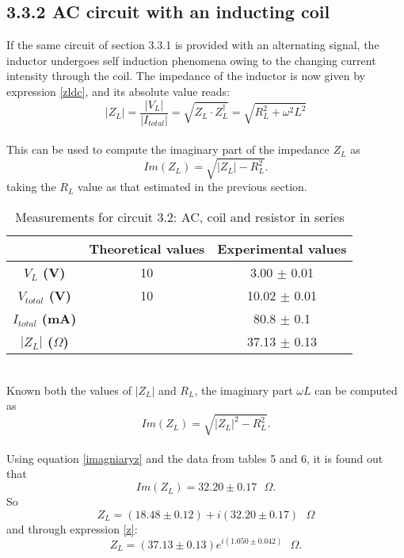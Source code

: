 \documentclass[a4paper, 12pt]{article}
\begin{document}
\subsection{3.3.2 AC circuit with an inducting coil}
If the same circuit of section 3.3.1 is provided with an alternating signal, the inductor undergoes self induction phenomena owing to the changing current intensity through the coil. The impedance of the inductor is now given by expression \ref{zldc}, and its absolute value reads:
\begin{equation}\label{abszl}
	|Z_L| = \frac{|V_L|}{|I_{total}|} = \sqrt{Z_L \cdot Z_L^\dagger} = \sqrt{R_L^2 + \omega^2L^2}
\end{equation}\\

This can be used to compute the imaginary part of the impedance $Z_L$ as
\begin{equation}\label{imzl}
	Im(Z_L) = \sqrt{|Z_L| - R_L^2}.
\end{equation}
taking the $R_L$ value as that estimated in the previous section.
\begin{table}[hbt!]
	\centering
	\begin{tabular}{|c|c|c|}
		\hline
		& \textbf{Theoretical values} & \textbf{Experimental values} \\
		\hline
		\textbf{$V_{L}$ (V)} & 10 & 3.00 $\pm$ 0.01 \\
		\textbf{$V_{total}$ (V)} & 10 & 10.02 $\pm$ 0.01\\
		\hline
		\textbf{$I_{total}$ (mA)} & & 80.8 $\pm$ 0.1 \\
		\hline
		\textbf{$|Z_{L}|$ ($\Omega$)} &  & 37.13 $\pm$ 0.13 \\
		\hline
	\end{tabular}
	\caption{Measurements for circuit 3.2: AC, coil and resistor in series}
\end{table}\\

Known both the values of $|Z_L|$ and $R_L$, the imaginary part $\omega L$ can be computed as 
\begin{equation}\label{imagniaryz}
	Im(Z_L) = \sqrt{|Z_L|^2 - R_L^2}.
\end{equation}\\

Using equation \ref{imagniaryz} and the data from tables 5 and 6, it is found out that
\begin{equation*}
	Im(Z_L) = 32.20 \pm 0.17 \mbox{ } \Omega. 
\end{equation*}
So
\begin{equation*}
		Z_L = (18.48 \pm 0.12) + i(32.20 \pm 0.17) \mbox{ } \Omega
\end{equation*}
and through expression \ref{z}:
\begin{equation*}
	Z_L = (37.13 \pm 0.13)e^{i(1.050 \pm 0.042)} \mbox{ } \Omega. 
\end{equation*}
\end{document}
